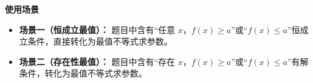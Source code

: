 \begin{explanationbox}
	\medskip
	\textbf{\textcolor{CExplanation}{使用场景}}
	\begin{itemize}[leftmargin=*, itemsep=0.5em, topsep=0.4em]
		\item \textbf{场景一（恒成立最值）：} 题目中含有“任意 $x$，$f(x)\ge a$”或“$f(x)\le a$”恒成立条件，直接转化为最值不等式求参数。
		\item \textbf{场景二（存在性最值）：} 题目中含有“存在 $x$，$f(x)\ge a$”或“$f(x)\le a$”有解条件，转化为最值不等式求参数。
	\end{itemize}

\end{explanationbox}
